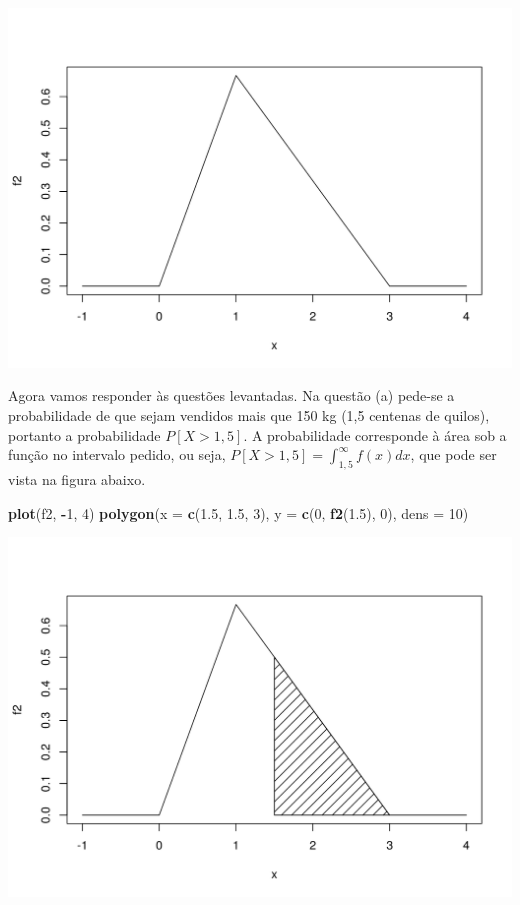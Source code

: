 \documentclass[10pt,a4paper]{book}
\newenvironment{Shaded}{\begin{snugshade}}{\end{snugshade}}
\newcommand{\KeywordTok}[1]{\textcolor[rgb]{0.13,0.29,0.53}{\textbf{#1}}}
\newcommand{\DataTypeTok}[1]{\textcolor[rgb]{0.13,0.29,0.53}{#1}}
\newcommand{\DecValTok}[1]{\textcolor[rgb]{0.00,0.00,0.81}{#1}}
\newcommand{\FloatTok}[1]{\textcolor[rgb]{0.00,0.00,0.81}{#1}}
\newcommand{\OperatorTok}[1]{\textcolor[rgb]{0.81,0.36,0.00}{\textbf{#1}}}
\newcommand{\NormalTok}[1]{#1}
\begin{document}
\begin{center}\includegraphics{figures/unnamed-chunk-331-1} \end{center}

Agora vamos responder às questões levantadas. Na questão (a) pede-se a
probabilidade de que sejam vendidos mais que 150 kg (1,5 centenas de
quilos), portanto a probabilidade \(P[X > 1,5]\). A probabilidade
corresponde à área sob a função no intervalo pedido, ou seja,
\(P[X > 1,5] = \int_{1,5}^\infty f(x) dx\), que pode ser vista na figura
abaixo.

\begin{Shaded}
\begin{Highlighting}[]
\KeywordTok{plot}\NormalTok{(f2, }\OperatorTok{-}\DecValTok{1}\NormalTok{, }\DecValTok{4}\NormalTok{)}
\KeywordTok{polygon}\NormalTok{(}\DataTypeTok{x =} \KeywordTok{c}\NormalTok{(}\FloatTok{1.5}\NormalTok{, }\FloatTok{1.5}\NormalTok{, }\DecValTok{3}\NormalTok{), }\DataTypeTok{y =} \KeywordTok{c}\NormalTok{(}\DecValTok{0}\NormalTok{, }\KeywordTok{f2}\NormalTok{(}\FloatTok{1.5}\NormalTok{), }\DecValTok{0}\NormalTok{), }\DataTypeTok{dens =} \DecValTok{10}\NormalTok{)}
\end{Highlighting}
\end{Shaded}

\begin{center}\includegraphics{figures/unnamed-chunk-332-1} \end{center}
\end{document}
